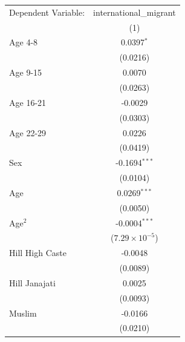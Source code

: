 \begingroup
\centering
\renewcommand{\arraystretch}{0.75}   %
\setlength{\aboverulesep}{0pt}       %
\setlength{\belowrulesep}{0pt} 
\begin{tabular}{lc}
   \tabularnewline \midrule \midrule
   Dependent Variable:                               & international\_migrant\\   
                                                          & (1)\\  
   \midrule
  
   Age 4-8                             & 0.0397$^{*}$\\   
                                                     & (0.0216)\\   
   Age 9-15                             & 0.0070\\   
                                                     & (0.0263)\\   
   Age 16-21                             & -0.0029\\   
                                                     & (0.0303)\\   
   Age 22-29                             & 0.0226\\   
                                                     & (0.0419)\\   
   Sex                                               & -0.1694$^{***}$\\   
                                                     & (0.0104)\\   
   Age                                               & 0.0269$^{***}$\\   
                                                     & (0.0050)\\   
   Age$^2$                                      & -0.0004$^{***}$\\   
                                                     & ($7.29\times 10^{-5}$)\\    
   Hill High Caste                    & -0.0048\\   
                                                     & (0.0089)\\   
   Hill Janajati                     & 0.0025\\   
                                                     & (0.0093)\\   
   Muslim                           & -0.0166\\   
                                                     & (0.0210)\\   

\end{tabular}

